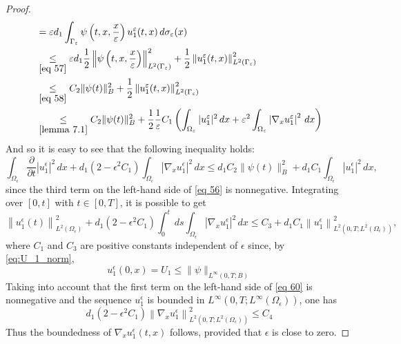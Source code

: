 \begin{proof}
\begin{equation*}
\begin{aligned}
    &=\epsilon d_{1} \int_{\Gamma_{\epsilon}} \psi\left(t, x, \frac{x}{\epsilon}\right) u_{1}^{\epsilon}(t, x) \, {d} \sigma_{\epsilon}(x) \\
    &\underset{\eqref{eq 57}}{\leq} \epsilon d_{1} \frac{1}{2}\left\|\psi\left(t, x, \frac{x}{\epsilon}\right)\right\|_{L^{2}\left(\Gamma_{\epsilon}\right)}^{2}+\frac{1}{2}\left\|u_{1}^{\epsilon}(t, x)\right\|_{L^{2}\left(\Gamma_{\epsilon}\right)}^{2} \\ 
    &\underset{\eqref{eq 58}}{\leq} C_{2}\|\psi(t)\|_{B}^{2} +\frac{1}{2}\left\|u_{1}^{\epsilon}(t, x)\right\|_{L^{2}\left(\Gamma_{\epsilon}\right)}^{2}\\
    &\underset{\eqref{lemma 7.1}}{\leq}  C_{2}\|\psi(t)\|_{B}^{2} + \frac{1}{2}\frac{1}{\epsilon}C_{1}\left( \int_{\Omega_{\epsilon}}|u_{1}^{\epsilon}|^{2} \, {d} x+{\epsilon^2}\int_{\Omega_{\epsilon}}\left|\nabla_{x} u_{1}^{\epsilon}\right|^{2} \, {d} x\right)
\end{aligned}
\end{equation*}
And so it is easy to see that the following inequality holds:
\begin{equation}
\int_{\Omega_{\epsilon}} \frac{\partial}{\partial t}\left|u_{1}^{\epsilon}\right|^{2} \, d  x+d_{1}\left(2-\epsilon^{2} C_{1}\right) \int_{\Omega_{\epsilon}}\left|\nabla_{x} u_{1}^{\epsilon}\right|^{2} \, {d} x\leq d_{1} C_{2}\|\psi(t)\|_{B}^{2}+d_{1} C_{1} \int_{\Omega_{\epsilon}}\left|u_{1}^{\epsilon}\right|^{2} \,{d} x,
\label{eq 59}\end{equation}
since the third term on the left-hand side of \eqref{eq 56} is nonnegative. Integrating over $[0, t]$ with $t \in[0, T]$, it is possible to get
\begin{equation}
  \left\|u_{1}^{\epsilon}(t)\right\|_{L^{2}\left(\Omega_{\epsilon}\right)}^{2}+d_{1}\left(2-\epsilon^{2} C_{1}\right) \int_{0}^{t} \, d  s \int_{\Omega_{\epsilon}}\left|\nabla_{x} u_{1}^{\epsilon}\right|^{2} \, d  x \leq C_{3}+d_{1} C_{1}\left\|u_{1}^{\epsilon}\right\|_{L^{2}\left(0, T ; L^{2}\left(\Omega_{\epsilon}\right)\right)}^{2},
\label{eq 60}\end{equation}
where $C_{1}$ and $C_{3}$ are positive constants independent of $\epsilon$ since, by \eqref{eq:U_1_norm},
$$
u_{1}^{\epsilon}(0, x)=U_{1} \leq\|\psi\|_{L^{\infty}(0, T ; B)}
$$
Taking into account that the first term on the left-hand side of \eqref{eq 60} is nonnegative and the sequence $u_{1}^{\epsilon}$ is bounded in $L^{\infty}\left(0, T ; L^{\infty}\left(\Omega_{\epsilon}\right)\right)$, one has
\begin{equation}
  d_{1}\left(2-\epsilon^{2} C_{1}\right)\left\|\nabla_{x} u_{1}^{\epsilon}\right\|_{L^{2}\left(0, T ; L^{2}\left(\Omega_{\epsilon}\right)\right)}^{2} \leq C_{4}
\label{eq 61}\end{equation}
Thus the boundedness of $\nabla_{x} u_{1}^{\epsilon}(t, x)$ follows, provided that $\epsilon$ is close to zero.
\end{proof} 
